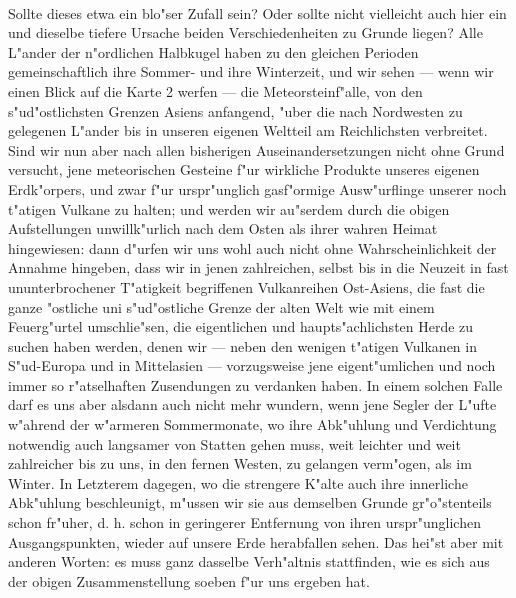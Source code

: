 \documentclass[a4paper, 8pt, oneside, polutonikogreek, german]{article}
\begin{document}
\paragraph{}
Sollte dieses etwa ein blo"ser Zufall sein? Oder sollte nicht vielleicht auch hier ein und dieselbe tiefere Ursache beiden Verschiedenheiten zu Grunde liegen? Alle L"ander der n"ordlichen Halbkugel haben zu den gleichen Perioden gemeinschaftlich ihre Sommer- und ihre Winterzeit, und wir sehen --- wenn wir einen Blick auf die Karte 2 werfen --- die Meteorsteinf"alle, von den s"ud"ostlichsten Grenzen Asiens anfangend, "uber die nach Nordwesten zu gelegenen L"ander bis in unseren eigenen Weltteil am Reichlichsten verbreitet. Sind wir nun aber nach allen bisherigen Auseinandersetzungen nicht ohne Grund versucht, jene meteorischen Gesteine f"ur wirkliche Produkte unseres eigenen Erdk"orpers, und zwar f"ur urspr"unglich gasf"ormige Ausw"urflinge unserer noch t"atigen Vulkane zu halten; und werden wir au"serdem durch die obigen Aufstellungen unwillk"urlich nach dem Osten als ihrer wahren Heimat hingewiesen: dann d"urfen wir uns wohl auch nicht ohne Wahrscheinlichkeit der Annahme hingeben, dass wir in jenen zahlreichen, selbst bis in die Neuzeit in fast ununterbrochener T"atigkeit begriffenen Vulkanreihen Ost-Asiens, die fast die ganze "ostliche uni s"ud"ostliche Grenze der alten Welt wie mit einem Feuerg"urtel umschlie"sen, die eigentlichen und haupts"achlichsten Herde zu suchen haben werden, denen wir --- neben den wenigen t"atigen Vulkanen in S"ud-Europa und in Mittelasien --- vorzugsweise jene eigent"umlichen und noch immer so r"atselhaften Zusendungen zu verdanken haben. In einem solchen Falle darf es uns aber alsdann auch nicht mehr wundern, wenn jene Segler der L"ufte w"ahrend der w"armeren Sommermonate, wo ihre Abk"uhlung und Verdichtung notwendig auch langsamer von Statten gehen muss, weit leichter und weit zahlreicher bis zu uns, in den fernen Westen, zu gelangen verm"ogen, als im Winter. In Letzterem dagegen, wo die strengere K"alte auch ihre innerliche Abk"uhlung beschleunigt, m"ussen wir sie aus demselben Grunde gr"o"stenteils schon fr"uher, d. h. schon in geringerer Entfernung von ihren urspr"unglichen Ausgangspunkten, wieder auf unsere Erde herabfallen sehen. Das hei"st aber mit anderen Worten: es muss ganz dasselbe Verh"altnis stattfinden, wie es sich aus der obigen Zusammenstellung soeben f"ur uns ergeben hat.
\end{document}
